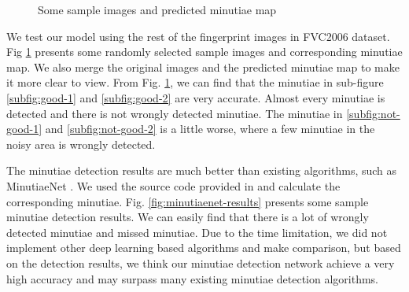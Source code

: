 \begin{figure}[htbp]
\begin{minipage}{0.48\linewidth}
{        }
    \end{minipage}

    \caption{Some sample images and predicted minutiae map}
    \label{fig:minutiae-map}
\end{figure}

We test our model using the rest of the fingerprint images in FVC2006 dataset.
Fig \ref{fig:minutiae-map} presents some randomly selected sample images and corresponding minutiae map.
We also merge the original images and the predicted minutiae map to make it more clear to view.
From Fig. \ref{fig:minutiae-map}, we can find that the minutiae in sub-figure \ref{subfig:good-1} and \ref{subfig:good-2} are very accurate.
Almost every minutiae is detected and there is not wrongly detected minutiae.
The minutiae in \ref{subfig:not-good-1} and \ref{subfig:not-good-2} is a little worse, where a few minutiae in the noisy area is wrongly detected.

The minutiae detection results are much better than existing algorithms, such as MinutiaeNet \cite{MinutiaeNet}.
We used the source code provided in \cite{MinutiaeNet} and calculate the corresponding minutiae.
Fig. \ref{fig:minutiaenet-results} presents some sample minutiae detection results.
We can easily find that there is a lot of wrongly detected minutiae and missed minutiae.
Due to the time limitation, we did not implement other deep learning based algorithms and make comparison, but based on the detection results, we think our minutiae detection network achieve a very high accuracy and may surpass many existing minutiae detection algorithms.

